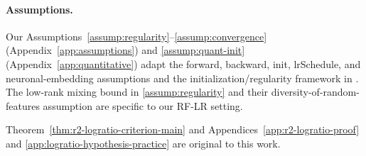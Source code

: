 \documentclass[nohyperref]{article}
\theoremstyle{plain}
\theoremstyle{definition}
\theoremstyle{remark}
\begin{document}
\paragraph{Assumptions.} Our Assumptions~\ref{assump:regularity}--\ref{assump:convergence} (Appendix~\ref{app:assumptions}) and \ref{assump:quant-init} (Appendix~\ref{app:quantitative}) adapt the forward, backward, init, lrSchedule, and neuronal-embedding assumptions and the initialization/regularity framework in \cite{nguyen2023rigorousframeworkmeanfield}. The low-rank mixing bound in \ref{assump:regularity} and their diversity-of-random-features assumption are specific to our RF-LR setting.

Theorem~\ref{thm:r2-logratio-criterion-main} and Appendices~\ref{app:r2-logratio-proof} and \ref{app:logratio-hypothesis-practice} are original to this work.
\end{document}
